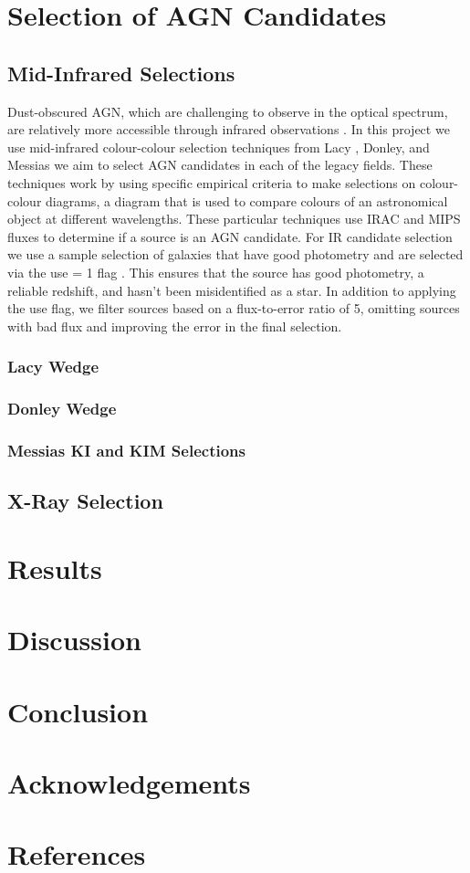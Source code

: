 \documentclass[12pt]{iopart}
\begin{document}
\section{Selection of AGN Candidates}
\subsection{Mid-Infrared Selections}
Dust-obscured AGN, which are challenging to observe in the optical spectrum, are relatively more accessible through infrared observations \cite{yutani_origin_2022}. In this project we use mid-infrared colour-colour selection techniques from Lacy \cite{lacy_obscured_2004, lacy_optical_2007}, Donley\cite{donley_spitzer_2007, donley_identifying_2012}, and Messias \cite{messias_new_2012, messias_dependency_2014} we aim to select AGN candidates in each of the legacy fields. These techniques work by using specific empirical criteria to make selections on colour-colour diagrams, a diagram that is used to compare colours of an astronomical object at different wavelengths. These particular techniques use IRAC and MIPS fluxes to determine if a source is an AGN candidate. For IR candidate selection we use a sample selection of galaxies that have good photometry and are selected via the use = 1 flag \cite{straatman_fourstar_2016}. This ensures that the source has good photometry, a reliable redshift, and hasn't been misidentified as a star. In addition to applying the use flag, we filter sources based on a flux-to-error ratio of 5, omitting sources with bad flux and improving the error in the final selection.
\subsubsection{Lacy Wedge}
\subsubsection{Donley Wedge}
\subsubsection{Messias KI and KIM Selections}
\subsection{X-Ray Selection}
\newpage
\section{Results}
\section{Discussion}
\section{Conclusion}
\section{Acknowledgements}
\section{References}



\end{document}
